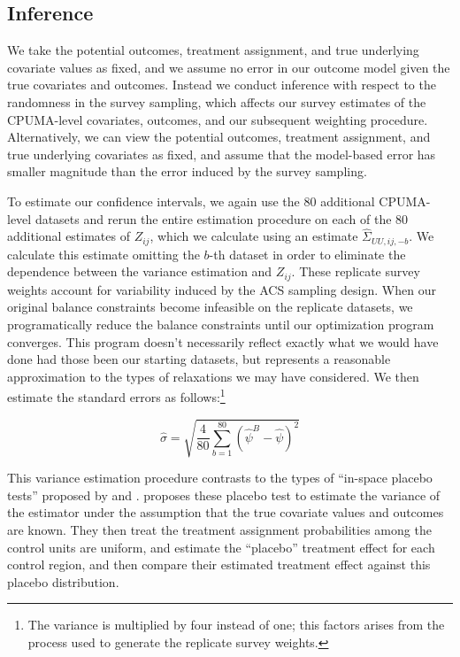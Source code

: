 \documentclass[12pt]{article}
\begin{document}
\subsection{Inference}

We take the potential outcomes, treatment assignment, and true underlying covariate values as fixed, and we assume no error in our outcome model given the true covariates and outcomes. Instead we conduct inference with respect to the randomness in the survey sampling, which affects our survey estimates of the CPUMA-level covariates, outcomes, and our subsequent weighting procedure.  Alternatively, we can view the potential outcomes, treatment assignment, and true underlying covariates as fixed, and assume that the model-based error has smaller magnitude than the error induced by the survey sampling.

To estimate our confidence intervals, we again use the 80 additional CPUMA-level datasets and rerun the entire estimation procedure on each of the 80 additional estimates of $Z_{ij}$, which we calculate using an estimate $\hat{\Sigma}_{UU, ij, -b}$. We calculate this estimate omitting the $b$-th dataset in order to eliminate the dependence between the variance estimation and $Z_{ij}$. These replicate survey weights account for variability induced by the ACS sampling design. When our original balance constraints become infeasible on the replicate datasets, we programatically reduce the balance constraints until our optimization program converges. This program doesn't necessarily reflect exactly what we would have done had those been our starting datasets, but represents a reasonable approximation to the types of relaxations we may have considered. We then estimate the standard errors as follows:\footnote{The variance is multiplied by four instead of one; this factors arises from the process used to generate the replicate survey weights.}

$$
\hat{\sigma} = \sqrt{\frac{4}{80}\sum_{b = 1}^{80}(\hat{\psi}^B - \hat{\psi})^2}
$$

This variance estimation procedure contrasts to the types of ``in-space placebo tests'' proposed by \cite{abadie2010synthetic} and \cite{abadie2015comparative}. \cite{abadie2010synthetic} proposes these placebo test to estimate the variance of the estimator under the assumption that the true covariate values and outcomes are known. They then treat the treatment assignment probabilities among the control units are uniform, and estimate the ``placebo'' treatment effect for each control region, and then compare their estimated treatment effect against this placebo distribution. 
\end{document}

